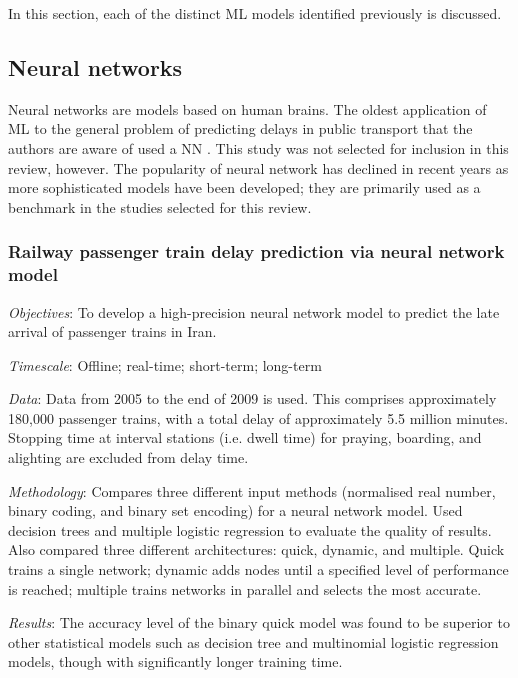 \documentclass{article}
\begin{document}
In this section, each of the distinct ML models identified previously is discussed. 

\subsection{Neural networks}

Neural networks are models based on human brains. The oldest application of ML to the general problem of predicting delays in public transport that the authors are aware of used a NN \cite{peters_et_al_2005}.  This study was not selected for inclusion in this review, however. The popularity of neural network has declined in recent years as more sophisticated models have been developed; they are primarily used as a benchmark in the studies selected for this review. 

\subsubsection{Railway passenger train delay prediction via neural network model \cite{yaghini_et_al_2013}}

\textit{Objectives}: To develop a high-precision neural network model to predict the late arrival of passenger trains in Iran.

\smallskip

\textit{Timescale}: Offline; real-time; short-term; long-term

\smallskip

\textit{Data}: Data from 2005 to the end of 2009 is used. This comprises approximately 180,000 passenger trains, with a total delay of approximately 5.5 million minutes. Stopping time at interval stations (i.e. dwell time) for praying, boarding, and alighting are excluded from delay time.  

\smallskip

\textit{Methodology}: Compares three different input methods (normalised real number, binary coding, and binary set encoding) for a neural network model. Used decision trees and multiple logistic regression to evaluate the quality of results. Also compared three different architectures: quick, dynamic, and multiple. Quick trains a single network; dynamic adds nodes until a specified level of performance is reached; multiple trains networks in parallel and selects the most accurate. 

\smallskip

\textit{Results}: The accuracy level of the binary quick model was found to be superior to other statistical models such as decision tree and multinomial logistic regression models, though with significantly longer training time.
\end{document}
